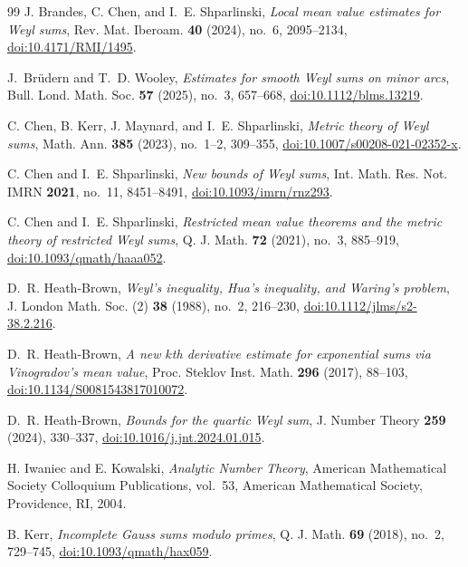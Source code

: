 \documentclass[11pt,reqno]{amsart}
\numberwithin{equation}{section}
\theoremstyle{definition}
\theoremstyle{remark}
\begin{document}
\begin{thebibliography}{99}
J. Brandes, C. Chen, and I.~E. Shparlinski,
\emph{Local mean value estimates for Weyl sums},
Rev. Mat. Iberoam. \textbf{40} (2024), no.~6, 2095--2134,
\href{https://doi.org/10.4171/RMI/1495}{doi:10.4171/RMI/1495}.


J.~Br\"udern and T.~D. Wooley,
\emph{Estimates for smooth Weyl sums on minor arcs},
Bull. Lond. Math. Soc. \textbf{57} (2025), no.~3, 657--668,
\href{https://doi.org/10.1112/blms.13219}{doi:10.1112/blms.13219}.

C. Chen, B. Kerr, J. Maynard, and I.~E. Shparlinski,
\emph{Metric theory of Weyl sums},
Math. Ann. \textbf{385} (2023), no.~1--2, 309--355,
\href{https://doi.org/10.1007/s00208-021-02352-x}{doi:10.1007/s00208-021-02352-x}.

C. Chen and I.~E. Shparlinski,
\emph{New bounds of Weyl sums},
Int. Math. Res. Not. IMRN \textbf{2021}, no.~11, 8451--8491,
\href{https://doi.org/10.1093/imrn/rnz293}{doi:10.1093/imrn/rnz293}.

C. Chen and I.~E. Shparlinski,
\emph{Restricted mean value theorems and the metric theory of restricted Weyl sums},
Q. J. Math. \textbf{72} (2021), no.~3, 885--919,
\href{https://doi.org/10.1093/qmath/haaa052}{doi:10.1093/qmath/haaa052}.

D.~R. Heath-Brown,
\emph{Weyl's inequality, Hua's inequality, and Waring's problem},
J. London Math. Soc. (2) \textbf{38} (1988), no.~2, 216--230,
\href{https://doi.org/10.1112/jlms/s2-38.2.216}{doi:10.1112/jlms/s2-38.2.216}.

D.~R. Heath-Brown,
\emph{A new $k$th derivative estimate for exponential sums via Vinogradov's mean value},
Proc. Steklov Inst. Math. \textbf{296} (2017), 88--103,
\href{https://doi.org/10.1134/S0081543817010072}{doi:10.1134/S0081543817010072}.

D.~R. Heath-Brown,
\emph{Bounds for the quartic Weyl sum},
J. Number Theory \textbf{259} (2024), 330--337,
\href{https://doi.org/10.1016/j.jnt.2024.01.015}{doi:10.1016/j.jnt.2024.01.015}.


H. Iwaniec and E. Kowalski,
\emph{Analytic Number Theory},
American Mathematical Society Colloquium Publications, vol.~53,
American Mathematical Society, Providence, RI, 2004.

B. Kerr,
\emph{Incomplete Gauss sums modulo primes},
Q. J. Math. \textbf{69} (2018), no.~2, 729--745,
\href{https://doi.org/10.1093/qmath/hax059}{doi:10.1093/qmath/hax059}.


\end{thebibliography}
\end{document}
